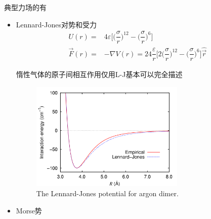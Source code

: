 {	典型力场的有
	\begin{itemize}
		\item \textrm{Lennard-Jones}对势和受力
	\begin{displaymath}
		\begin{aligned}
			U(r)=&4\varepsilon\bigg[\bigg(\dfrac{\sigma}{r}\bigg)^{12}-\bigg(\dfrac{\sigma}{r}\bigg)^6\bigg]\\ 
			\vec F(r)=&-\nabla V(r)=24\dfrac{\varepsilon}r\bigg[2\bigg(\dfrac{\sigma}{r}\bigg)^{12}-\bigg(\dfrac{\sigma}{r}\bigg)^6\bigg]\hat{\vec r}
		\end{aligned}
	\end{displaymath}
	{\fontsize{7.2pt}{6.2pt}\selectfont{这里$\varepsilon$和$\sigma$是和原子有关的参数}}
		\begin{itemize}{\fontsize{8.0pt}{6.2pt}}
		\end{itemize}
惰性气体的原子间相互作用仅用\textrm{L-J}基本可以完全描述
\begin{figure}[h!]
\centering
\vspace*{-0.15in}
\includegraphics[height=2.05in,width=2.90in,viewport=0 0 350 270,clip]{Figures/Argon_dimer_potential_and_Lennard-Jones.png}
\caption{\tiny \textrm{The Lennard-Jones potential for argon dimer.}}%
\label{Potential-Lennard-Jones}
\end{figure}
\item \textrm{Morse}势
	\begin{displaymath}

\end{displaymath}
\end{itemize}}
